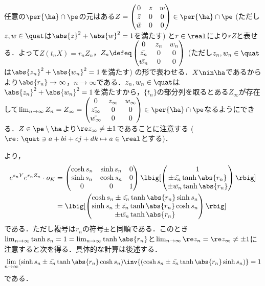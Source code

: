\begin{npfwn}
  任意の$\per{\ha}\cap\pe $の元はある$Z =
  \begin{pmatrix}
    0 & z & w \\
    \bar{z} & 0 & 0 \\
    \bar{w} & 0 & 0 
  \end{pmatrix} \in \per{\ha}\cap\pe $ (ただし$z,w\in \quat$は$ \abs{z}^2 +\abs{w}^2  = 1 $を満たす) と$r\in \real$により$rZ$と表せる．よって$Z(t_nX) = r_nZ_n$，$Z_n\defeq \begin{pmatrix}
    0 & z_n & w_n \\
    \bar{z_n} & 0 & 0 \\
    \bar{w_n} & 0 & 0 
  \end{pmatrix} $ (ただし$z_n,w_n\in \quat $は$ \abs{z_n}^2 +\abs{w_n}^2  = 1 $を満たす) の形で表わせる．$X\nin\ha$であるからより$\abs{r_n}\to \infty $，$n\to \infty$である．$z_n,w_n\in \quat $は$ \abs{z_n}^2 +\abs{w_n}^2  = 1 $を満たすから，$\{t_n\} $の部分列を取るとある$Z_{\infty} $が存在して$\lim_{n\to \infty}Z_n = Z_{\infty} =
  \begin{pmatrix}
    0 & z_{\infty} & w_{\infty} \\
    \bar{z_{\infty}} & 0 & 0 \\
    \bar{w_{\infty}} & 0 & 0 
  \end{pmatrix}
  \in \per{\ha}\cap\pe $なるようにできる．$Z\in\pe\setminus \ha $より$\re z_{\infty} \neq \pm 1$であることに注意する ($\re\colon \quat\ni a+bi+cj+dk\mapsto a\in \real$とする)．

  より， 
  \begin{align*}
    e^{s_n Y}e^{r_n Z_n}\cdot o_K &=
    \begin{pmatrix}
      \cosh s_n & \sinh s_n & 0 \\
      \sinh s_n & \cosh s_n & 0 \\
      0 & 0 & 1 
    \end{pmatrix}
              \lbig[\begin{pmatrix}
                1\\ \pm \bar{z_n} \tanh \abs{r_n}  \\ \pm \bar{w_n} \tanh \abs{r_n}
              \end{pmatrix}\rbig]\\
    &=  \lbig[ \begin{pmatrix}
      \cosh s_n \pm \bar{z_n} \tanh \abs{r_n} \sinh s_n \\ \sinh s_n \pm \bar{z_n} \tanh \abs{r_n} \cosh s_n \\ \pm \bar{w_n} \tanh \abs{r_n}
    \end{pmatrix}\rbig]
  \end{align*}
  である．ただし複号は$r_n$の符号$\pm$と同順である．このとき$\lim_{n\to \infty}\tanh s_n = 1 = \lim_{n\to \infty}\tanh \abs{r_n} $と$\lim_{n\to \infty} \re z_n = \re z_{\infty} \neq \pm 1$に注意すると次を得る．具体的な計算は後述する．
  \begin{align}
    \lim_{n\to \infty}(\sinh s_n \pm \bar{z_n} \tanh \abs{r_n} \cosh s_n)\inv{(\cosh s_n \pm \bar{z_n} \tanh \abs{r_n} \sinh s_n) } = 1\label{eq:-1}
  \end{align}
  である．


\end{npfwn}
